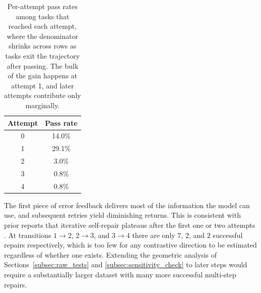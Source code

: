 \begin{table}[h]
\centering
\begin{tabular}{cc}
\toprule
Attempt & Pass rate \\
\midrule
0 & 14.0\% \\
1 & 29.1\% \\
2 & 3.0\%  \\
3 & 0.8\%  \\
4 & 0.8\%  \\
\bottomrule
\end{tabular}
\caption{Per-attempt pass rates among tasks that reached each attempt, where the denominator shrinks across rows as tasks exit the trajectory after passing. The bulk of the gain happens at attempt 1, and later attempts contribute only marginally.}
\label{tab:pass_rates}
\end{table}

The first piece of error feedback delivers most of the information the model can use, and subsequent retries yield diminishing returns. This is consistent with prior reports that iterative self-repair plateaus after the first one or two attempts \citep{arimbur2026howmanytries}. At transitions $1 \to 2$, $2 \to 3$, and $3 \to 4$ there are only $7$, $2$, and $2$ successful repairs respectively, which is too few for any contrastive direction to be estimated regardless of whether one exists. Extending the geometric analysis of Sections~\ref{subsec:raw_tests} and \ref{subsec:sensitivity_check} to later steps would require a substantially larger dataset with many more successful multi-step repairs.
